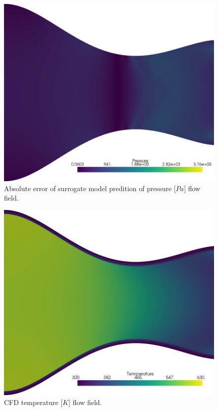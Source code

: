 \documentclass[10pt,oneside,a4paper,twocolumn]{article}
\begin{document}
\begin{figure}[htbp]
  \centering
  \includegraphics[width=0.8\columnwidth]{figures/Pressure_field_error.png}
  \caption{Absolute error of surrogate model predition of pressure [$Pa$] flow field.}
  \label{fig:error_pressure}
\end{figure}

\begin{figure}[htbp]
  \centering
  \includegraphics[width=0.8\columnwidth]{figures/Temperature_field_cfd.png}
  \caption{CFD temperature [$K$] flow field.}
  \label{fig:cfd_temperature}
\end{figure}
\end{document}

